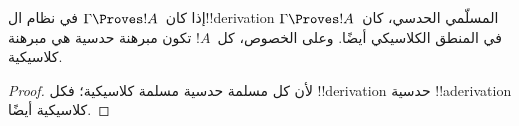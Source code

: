 \documentclass[../../../include/open-logic-section]{subfiles}
\begin{document}
\begin{prop}
  إذا كان~$\Gamma \Proves !A$ في نظام ال!!{derivation} المسلّمي
  الحدسي، كان~$\Gamma \Proves !A$ في المنطق الكلاسيكي أيضًا. وعلى
  الخصوص، كل~$!A$ تكون مبرهنة حدسية هي مبرهنة كلاسيكية.
\end{prop}

\begin{proof}
  لأن كل مسلمة حدسية مسلمة كلاسيكية؛ فكل !!{derivation} حدسية
  !!a{derivation} كلاسيكية أيضًا.
\end{proof}
\end{document}
